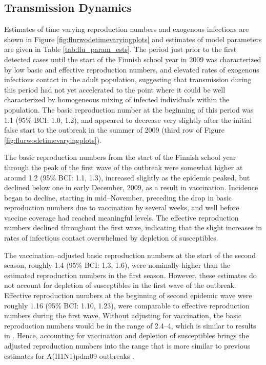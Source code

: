 \subsection{Transmission Dynamics}
\label{flu_res_dynamics}
Estimates of time varying reproduction numbers and exogenous infections are shown in Figure \ref{fig:flurwodetimevaryingplots} and estimates of model parameters are given in Table \ref{tab:flu_param_ests}. The period just prior to the first detected cases until the start of the Finnish school year in 2009 was characterized by low basic and effective reproduction numbers, and elevated rates of exogenous infectious contact in the adult population, suggesting that transmission during this period had not yet accelerated to the point where it could be well characterized by homogeneous mixing of infected individuals within the population. The basic reproduction number at the beginning of this period was 1.1 (95\% BCI: 1.0, 1.2), and appeared to decrease very slightly after the initial false start to the outbreak in the summer of 2009 (third row of Figure \ref{fig:flurwodetimevaryingplots}). 

The basic reproduction numbers from the start of the Finnish school year through the peak of the first wave of the outbreak were somewhat higher at around 1.2 (95\% BCI: 1.1, 1.3), increased slightly as the epidemic peaked, but declined below one in early December, 2009, as a result in vaccination. Incidence began to decline, starting in mid--November, preceding the drop in basic reproduction numbers due to vaccination by several weeks, and well before vaccine coverage had reached meaningful levels. The effective reproduction numbers declined throughout the first wave, indicating that the slight increases in rates of infectious contact overwhelmed by depletion of susceptibles.

The vaccination--adjusted basic reproduction numbers at the start of the second season, roughly 1.4 (95\% BCI: 1.3, 1.6), were nominally higher than the estimated reproduction numbers in the first season. However, these estimates do not account for depletion of susceptibles in the first wave of the outbreak. Effective reproduction numbers at the beginning of second epidemic wave were roughly 1.16 (95\% BCI: 1.10, 1.23), were comparable to effective reproduction numbers during the first wave. Without adjusting for vaccination, the basic reproduction numbers would be in the range of 2.4--4, which is similar to results in \cite{shubin2016revealing}. Hence, accounting for vaccination and depletion of susceptibles brings the adjusted reproduction numbers into the range that is more similar to previous estimates for A(H1N1)pdm09 outbreaks \cite{biggerstaff2014estimates}. 

